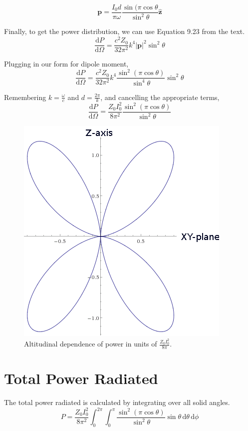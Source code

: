 \documentclass[10pt,a4paper]{article}
\begin{document}
\begin{equation}
\mathbf{p}=\frac{I_0 d}{\pi\omega}\frac{\sin(\pi\cos\theta}{\sin^2\theta}\hat{\mathbf{z}}
\end{equation}

Finally, to get the power distribution, we can use Equation 9.23 from the text.
\begin{equation}
\frac{\mathrm{d}P}{\mathrm{d}\Omega}= \frac{c^2 Z_0}{32 \pi^2}k^4|\mathbf{p}|^2\sin^2\theta
\end{equation}

Plugging in our form for dipole moment,
\begin{equation}
\frac{\mathrm{d}P}{\mathrm{d}\Omega}= \frac{c^2 Z_0}{32 \pi^2}k^4\frac{\sin^2(\pi\cos\theta)}{\sin^4\theta}\sin^2\theta
\end{equation}

Remembering $k=\frac{\omega}{c}$ and $d=\frac{2\pi}{k}$, and cancelling the appropriate terms,
\begin{equation}
\frac{\mathrm{d}P}{\mathrm{d}\Omega}=\frac{Z_0I_0^2}{8\pi^2}\frac{\sin^2(\pi\cos\theta)}{\sin^2\theta}
\end{equation}


\begin{figure}[hbtp]
\caption{Altitudinal dependence of power in units of $\frac{Z_0I_0^2}{8\pi}$.}
\includegraphics[scale=1]{Jackson9-16-plot.png}
\end{figure}


\section{Total Power Radiated}
The total power radiated is calculated by integrating over all solid angles.
\begin{equation}
P=\frac{Z_0I_0^2}{8\pi^2}\int_0^{2\pi}\int_0^\pi
\frac{\sin^2(\pi\cos\theta)}{\sin^2\theta}
\sin\theta\, \mathrm{d}\theta \, \mathrm{d}\phi
\end{equation}
\end{document}
